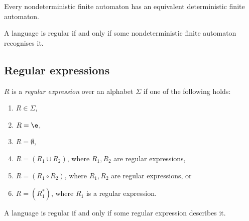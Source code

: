 \documentclass{article}
\begin{document}
\begin{theorem}[Sipser p. 55]
    Every nondeterministic finite automaton has an equivalent deterministic finite automaton.
\end{theorem}

\begin{corollary}[Sipser p. 56]
    A language is regular if and only if some nondeterministic finite automaton recognises it. 
\end{corollary}

\subsection{Regular expressions}

\begin{definition}[Sipser p. 64]
    $R$ is a \emph{regular expression} over an alphabet $\Sigma$ if one of the following holds:
    \begin{enumerate}
        \item $R\in\Sigma$,
        \item $R=\e$,
        \item $R=\emptyset$,
        \item $R=(R_1\cup R_2)$, where $R_1,R_2$ are regular expressions,
        \item $R=(R_1\circ R_2)$, where $R_1,R_2$ are regular expressions, or
        \item $R=(R_1^*)$, where $R_1$ is a regular expression.
    \end{enumerate} 
\end{definition}

\begin{theorem}[Sipser p. 66]
    A language is regular if and only if some regular expression describes it. 
\end{theorem}
\end{document}
